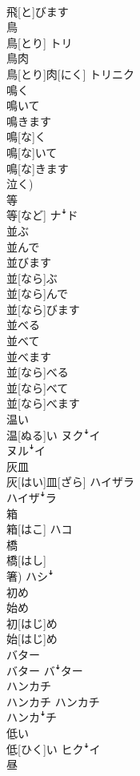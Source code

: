 \documentclass[8pt]{extreport}
\begin{document}
\begin{CJK}{UTF8}{min}
\\	飛[と]びます	
\\	鳥	
\\	鳥[とり]	トリ
\\	鳥肉	
\\	鳥[とり]肉[にく]	トリニク
\\	鳴く 
\\	鳴いて 
\\	鳴きます	
\\	鳴[な]く 
\\	鳴[な]いて 
\\	鳴[な]きます 
\\	泣く)	
\\	等	
\\	等[など]	ナꜜド
\\	並ぶ 
\\	並んで 
\\	並びます	
\\	並[なら]ぶ 
\\	並[なら]んで 
\\	並[なら]びます	
\\	並べる 
\\	並べて 
\\	並べます	
\\	並[なら]べる 
\\	並[なら]べて 
\\	並[なら]べます	
\\	温い	
\\	温[ぬる]い	ヌクꜜイ 
\\	ヌルꜜイ
\\	灰皿	
\\	灰[はい]皿[ざら]	ハイザラ 
\\	ハイザꜜラ
\\	箱	
\\	箱[はこ]	ハコ
\\	橋	
\\	橋[はし] 
\\	箸)	ハシꜜ
\\	初め 
\\	始め	
\\	初[はじ]め 
\\	始[はじ]め	
\\	バター	
\\	バター	バꜜター
\\	ハンカチ	
\\	ハンカチ	ハンカチ 
\\	ハンカꜜチ
\\	低い	
\\	低[ひく]い	ヒクꜜイ
\\	昼	

\end{CJK}
\end{document}
